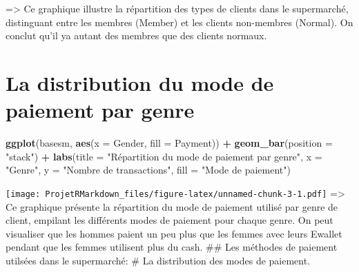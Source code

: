 \documentclass[
]{article}
\newenvironment{Shaded}{\begin{snugshade}}{\end{snugshade}}
\newcommand{\AttributeTok}[1]{\textcolor[rgb]{0.13,0.29,0.53}{#1}}
\newcommand{\FunctionTok}[1]{\textcolor[rgb]{0.13,0.29,0.53}{\textbf{#1}}}
\newcommand{\NormalTok}[1]{#1}
\newcommand{\SpecialCharTok}[1]{\textcolor[rgb]{0.81,0.36,0.00}{\textbf{#1}}}
\newcommand{\StringTok}[1]{\textcolor[rgb]{0.31,0.60,0.02}{#1}}
\begin{document}
=\textgreater{} Ce graphique illustre la répartition des types de
clients dans le supermarché, distinguant entre les membres (Member) et
les clients non-membres (Normal). On conclut qu'il ya autant des membres
que des clients normaux.

\hypertarget{la-distribution-du-mode-de-paiement-par-genre}{%
\section{La distribution du mode de paiement par
genre}\label{la-distribution-du-mode-de-paiement-par-genre}}

\begin{Shaded}
\begin{Highlighting}[]
\FunctionTok{ggplot}\NormalTok{(basesm, }\FunctionTok{aes}\NormalTok{(}\AttributeTok{x =}\NormalTok{ Gender, }\AttributeTok{fill =}\NormalTok{ Payment)) }\SpecialCharTok{+}
  \FunctionTok{geom\_bar}\NormalTok{(}\AttributeTok{position =} \StringTok{"stack"}\NormalTok{) }\SpecialCharTok{+}
  \FunctionTok{labs}\NormalTok{(}\AttributeTok{title =} \StringTok{"Répartition du mode de paiement par genre"}\NormalTok{,}
       \AttributeTok{x =} \StringTok{"Genre"}\NormalTok{,}
       \AttributeTok{y =} \StringTok{"Nombre de transactions"}\NormalTok{,}
       \AttributeTok{fill =} \StringTok{"Mode de paiement"}\NormalTok{)}
\end{Highlighting}
\end{Shaded}

\texttt{[image: ProjetRMarkdown\_files/figure-latex/unnamed-chunk-3-1.pdf]}
=\textgreater{} Ce graphique présente la répartition du mode de paiement
utilisé par genre de client, empilant les différents modes de paiement
pour chaque genre. On peut visualiser que les hommes paient un peu plus
que les femmes avec leurs Ewallet pendant que les femmes utilisent plus
du cash. \#\# Les méthodes de paiement utilsées dans le supermarché: \#
La distribution des modes de paiement.

\begin{Shaded}
\end{Shaded}
\end{document}
